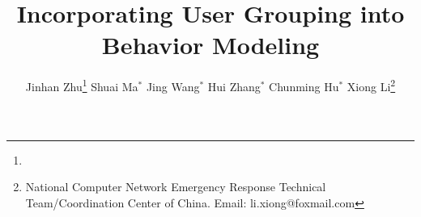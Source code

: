 \documentclass[twoside,leqno,twocolumn]{article}
\begin{document}
\begin{CJK*}{GBK}{song}
\begin{comment}
\date{}	
\end{comment}

\title{\Large Incorporating User Grouping into \Retg{} Behavior Modeling}
\author{Jinhan Zhu\thanks{\beihang}
\hspace{2ex} Shuai Ma$^{*}$
\hspace{2ex} Jing Wang$^{*}$
\hspace{2ex} Hui Zhang$^{*}$
\hspace{2ex} Chunming Hu$^{*}$
\hspace{2ex} Xiong Li\thanks{National Computer Network Emergency Response Technical Team/Coordination Center of China.  Email: li.xiong@foxmail.com}}


\date{}	

\maketitle



















%



\balance
\begin{small}

\end{small}


\end{CJK*}
\end{document}
